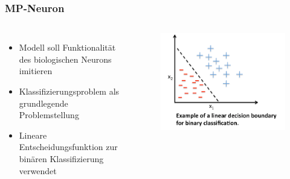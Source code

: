 \begin{frame}
\frametitle{MP-Neuron}

\begin{columns}

\begin{itemize}
	\item Modell soll Funktionalität des biologischen Neurons imitieren
	\item Klassifizierungsproblem als grundlegende Problemstellung
	\item Lineare Entscheidungsfunktion zur binären Klassifizierung verwendet
\end{itemize}


\begin{figure}
	\includegraphics[width=\linewidth]{./geschichtliches/mcCullochPittsNeuron/img/bnKlassifizierung_alpha}
\end{figure}

\end{columns}

\end{frame}


